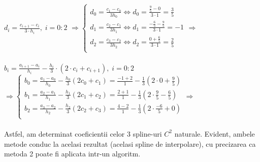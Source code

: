 \documentclass{article}
\begin{document}
$d_i = \frac{c_{i+1} - c_i}{3 \cdot h_i},\; i = 0 : 2$
$\Longrightarrow \begin{cases}
  d_0 = \frac{c_1-c_0}{3h_0} \iff d_0 = \frac{\frac{9}{5}-0}{3 \cdot 1} = \frac{3}{5} \\
  d_1 = \frac{c_2-c_1}{3h_1} \iff d_1 = \frac{-\frac{6}{5}-\frac{9}{5}}{3 \cdot 1} = -1 \\
  d_2 = \frac{c_3-c_2}{3h_2} \iff d_2 = \frac{0+\frac{6}{5}}{3 \cdot 1} = \frac{2}{5} \\
\end{cases} \Longrightarrow$
\\\\


$b_i = \frac{a_{i+1} - a_i}{h_i} - \frac{h_i}{3} \cdot (2 \cdot c_i + c_{i+1}),\; i = 0 : 2$
$\Longrightarrow \begin{cases}
    b_0 = \frac{a_1-a_0}{h_0} - \frac{h_0}{3}(2c_0+c_1) = \frac{-1+2}{1} - \frac{1}{3}(2 \cdot 0 + \frac{9}{5})  \\
    b_1 = \frac{a_2-a_1}{h_1} - \frac{h_1}{3}(2c_1+c_2) = \frac{2+1}{1} - \frac{1}{3}(2 \cdot \frac{9}{5} - \frac{6}{5}) \\
    b_2 = \frac{a_3-a_2}{h_2} - \frac{h_2}{3}(2c_2+c_3) = \frac{4-2}{1} - \frac{1}{3}(2 \cdot \frac{-6}{5} + 0) \\
\end{cases} \Longrightarrow$\\\\

Astfel, am determinat coeficientii celor 3 spline-uri $C^2$ naturale. Evident, ambele metode conduc la acelasi rezultat (acelasi spline de interpolare), cu precizarea ca metoda 2 poate fi aplicata intr-un algoritm.
\end{document}
